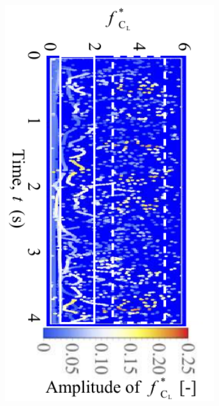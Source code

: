 \documentclass[oneside]{utmthesis}
\begin{document}
\begin{figure}[H]
\begin{subfigure}[h]{0.49\textwidth}
    \includegraphics[angle=90,width=1\textwidth]{figs/instantLiftFreq-b}
    \caption{}
    \label{fig:instantLiftFreq-b}
  \end{subfigure}
  \hfill
  \begin{subfigure}[h]{0.49\textwidth}

\end{subfigure}
\end{figure}
\end{document}
